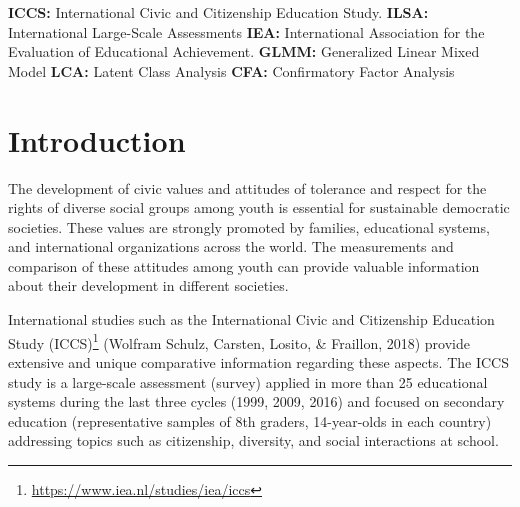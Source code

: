 \documentclass[12pt,a4paper,oneside]{reedthesis}
\begin{document}
  \begin{listabbrev}
    \textbf{ICCS:} International Civic and Citizenship Education Study. \newline
    \textbf{ILSA:} International Large-Scale Assessments \newline
    \textbf{IEA:} International Association for the Evaluation of Educational Achievement. \newline
    \textbf{GLMM:} Generalized Linear Mixed Model \newline
    \textbf{LCA:} Latent Class Analysis \newline
    \textbf{CFA:} Confirmatory Factor Analysis \newline
  \end{listabbrev}
  \hypersetup{linkcolor=black}
  \setcounter{secnumdepth}{2}
  \setcounter{tocdepth}{2}
  \tableofcontents


  \listoftables

  \listoffigures


\mainmatter %
\pagestyle{fancyplain} %

\hypertarget{introduction}{%
\chapter{Introduction}\label{introduction}}

The development of civic values and attitudes of tolerance and respect for the rights of diverse social groups among youth is essential for sustainable democratic societies. These values are strongly promoted by families, educational systems, and international organizations across the world. The measurements and comparison of these attitudes among youth can provide valuable information about their development in different societies.

International studies such as the International Civic and Citizenship Education Study (ICCS)\footnote{\url{https://www.iea.nl/studies/iea/iccs}} (Wolfram Schulz, Carsten, Losito, \& Fraillon, 2018) provide extensive and unique comparative information regarding these aspects. The ICCS study is a large-scale assessment (survey) applied in more than 25 educational systems during the last three cycles (1999, 2009, 2016) and focused on secondary education (representative samples of 8th graders, 14-year-olds in each country) addressing topics such as citizenship, diversity, and social interactions at school.
\end{document}
